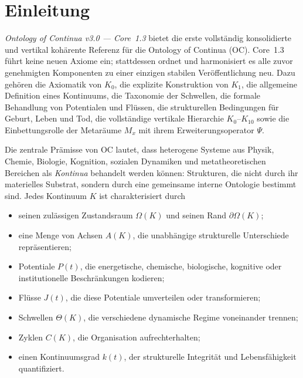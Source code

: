 
\section{Einleitung}
\label{sec:intro}

\emph{Ontology of Continua v3.0 — Core~1.3} bietet die erste vollständig konsolidierte und vertikal kohärente Referenz für die Ontology of Continua (OC). Core~1.3 führt keine neuen Axiome ein; stattdessen ordnet und harmonisiert es alle zuvor genehmigten Komponenten zu einer einzigen stabilen Veröffentlichung neu. Dazu gehören die Axiomatik von \(K_0\), die explizite Konstruktion von \(K_1\), die allgemeine Definition eines Kontinuums, die Taxonomie der Schwellen, die formale Behandlung von Potentialen und Flüssen, die strukturellen Bedingungen für Geburt, Leben und Tod, die vollständige vertikale Hierarchie \(K_0\)–\(K_{10}\) sowie die Einbettungsrolle der Metaräume \(M_x\) mit ihrem Erweiterungsoperator \(\Psi\).

Die zentrale Prämisse von OC lautet, dass heterogene Systeme aus Physik, Chemie, Biologie, Kognition, sozialen Dynamiken und metatheoretischen Bereichen als \emph{Kontinua} behandelt werden können: Strukturen, die nicht durch ihr materielles Substrat, sondern durch eine gemeinsame interne Ontologie bestimmt sind. Jedes Kontinuum \(K\) ist charakterisiert durch

\begin{itemize}
    \item seinen zulässigen Zustandsraum \(\Omega(K)\) und seinen Rand \(\partial\Omega(K)\);
    \item eine Menge von Achsen \(A(K)\), die unabhängige strukturelle Unterschiede repräsentieren;
    \item Potentiale \(P(t)\), die energetische, chemische, biologische, kognitive oder institutionelle Beschränkungen kodieren;
    \item Flüsse \(J(t)\), die diese Potentiale umverteilen oder transformieren;
    \item Schwellen \(\Theta(K)\), die verschiedene dynamische Regime voneinander trennen;
    \item Zyklen \(C(K)\), die Organisation aufrechterhalten;
    \item einen Kontinuumsgrad \(k(t)\), der strukturelle Integrität und Lebensfähigkeit quantifiziert.
\end{itemize}

